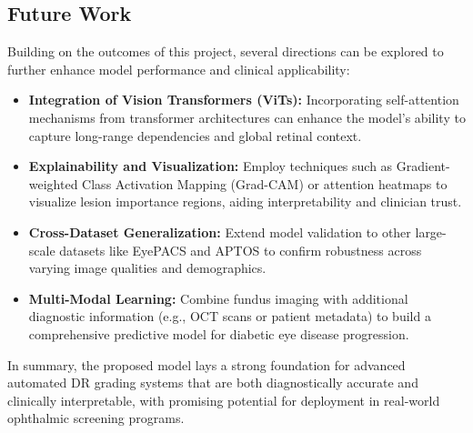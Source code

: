\documentclass[12pt,a4paper]{article}
\begin{document}
\subsection{Future Work}
Building on the outcomes of this project, several directions can be explored to further enhance model performance and clinical applicability:
\begin{itemize}
    \item \textbf{Integration of Vision Transformers (ViTs):} Incorporating self-attention mechanisms from transformer architectures can enhance the model’s ability to capture long-range dependencies and global retinal context.
    \item \textbf{Explainability and Visualization:} Employ techniques such as Gradient-weighted Class Activation Mapping (Grad-CAM) or attention heatmaps to visualize lesion importance regions, aiding interpretability and clinician trust.
    \item \textbf{Cross-Dataset Generalization:} Extend model validation to other large-scale datasets like EyePACS and APTOS to confirm robustness across varying image qualities and demographics.
    \item \textbf{Multi-Modal Learning:} Combine fundus imaging with additional diagnostic information (e.g., OCT scans or patient metadata) to build a comprehensive predictive model for diabetic eye disease progression.
\end{itemize}

In summary, the proposed model lays a strong foundation for advanced automated DR grading systems that are both diagnostically accurate and clinically interpretable, with promising potential for deployment in real-world ophthalmic screening programs.



\end{document}
